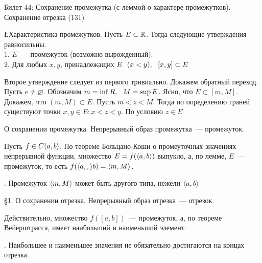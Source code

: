 Билет 44: Сохранение промежутка (с леммой о характере промежутков). Сохранение отрезка
(131)

\L \q Характеристика промежутков. Пусть $E \subset \mathbb{R}$. Тогда следующие утверждения равносильны.\\
1. $E$~--- промежуток (возможно вырожденный).\\
2. Для любых $x, y$, принадлежащих $E\ \  (x < y),\ \  [x, y] \subset E$

\D Второе утверждение следует из первого тривиально. Докажем обратный переход. Пусть $e \neq \varnothing$. Обозначим $m = \inf R,\ \  M = \sup E$. Ясно, что $E \subset [m, M]$. Докажем, что $(m, M) \subset E$. Пусть $m < z < M$. Тогда по определению граней существуют точки $x, y \in E: x < z < y$. По условию $z \in E$

\T \q О сохранении промежутка. Непрерывный образ промежутка~--- промежуток.

\D Пусть $f \in C\langle a, b \rangle$,  По теореме Больцано-Коши о промеуточных значениях непрерывной функции, множество $E = f(\langle a, b \rangle)$ выпукло, а, по лемме, $E$~--- промежуток, то есть $f(\langle a, , \rangle b) = \langle m, M \rangle$.

. Промежуток $\langle m, M \rangle$ может быть другого типа, нежели $\langle a, b \rangle$

\S1. \q О сохранении отрезка. Непрерывный образ отрезка~--- отрезок. 

\D Действительно, множество $f([a, b])$~--- промежуток, а, по теореме Вейерштрасса, имеет наибольший и наименьший элемент.

. Наибольшее и наименьшее значения не обязательно достигаются на концах отрезка.